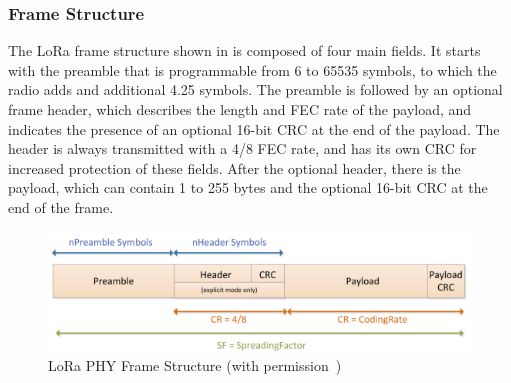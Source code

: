 
\subsubsection{Frame Structure}
The \ac{LoRa} frame structure shown in  is composed of four main fields.
It starts with the preamble that is programmable from 6 to 65535 symbols, to which the radio adds and additional 4.25 symbols.
The preamble is followed by an optional frame header, which describes the length and \ac{FEC} rate of the payload, and indicates the presence of an optional 16-bit CRC at the end of the payload.
The header is always transmitted with a 4/8 \ac{FEC} rate, and has its own \ac{CRC} for increased protection of these fields.
After the optional header, there is the payload, which can contain 1 to 255 bytes and the optional 16-bit \ac{CRC} at the end of the frame.

\begin{figure}
  \centering
  \includegraphics[width=\columnwidth]{figures/frame.png}
  \caption{LoRa PHY Frame Structure (with permission~\cite{SX1276})}
  \label{fig:frame}
\end{figure}


